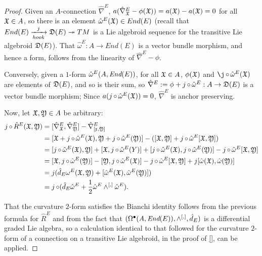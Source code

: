 \begin{proof}
Given an $A$-connection $\hat \nabla^E$, $a(\hat \nabla^E_{\oid X} - \phi(\oid X)) = a(\oid X) - a(\oid X) = 0$ for all $\mathfrak{X} \in A$, so there is an element $\hat \omega^E(\mathfrak{X}) \in End(E)$ (recall that $End(E) \xrightarrow[hook]{j} \mathfrak{D}(E) \twoheadrightarrow TM$ is a Lie algebroid sequence for the transitive Lie algebroid $\mathfrak{D}(E)$). That $\hat \omega^E: A \to End(E)$ is a vector bundle morphism, and hence a form, follows from the linearity of $\hat \nabla^E - \phi$. 

Conversely, given a $1$-form $\hat \omega^E(A, \operatorname{\textit{End}}(E))$, for all $\mathfrak{X} \in A$, $\phi(\oid X)$ and $\j \comp \hat \omega^E(\oid X)$ are elements of $\mathfrak{D}(E)$, and so is their sum, so $\hat \nabla^E := \phi + j \comp \hat \omega^E: A \to \alg D(E)$ is a vector bundle morphism; Since $a(j \operatorname{\circ} \hat \omega^E(\mathfrak{X})) = 0$, $\hat \nabla^E$ is anchor preserving.

Now, let $\mathfrak{X}, \mathfrak{Y} \in A$ be arbitrary:
\begin{align*}
    j \operatorname{\circ} \hat R^E(\mathfrak{X}, \mathfrak{Y}) 
        &= [\hat \nabla^E_{\mathfrak{X}}, \hat \nabla^E_{\mathfrak{Y}}] - \hat \nabla^E_{[\mathfrak{x}, \mathfrak{Y}]}\\
        &= [\mathfrak{X} + j \operatorname{\circ} \hat \omega^E(\mathfrak{X}), \mathfrak{Y} + j \operatorname{\circ} \hat \omega^E(\mathfrak{Y})] - ([\mathfrak{X}, \mathfrak{Y}] + j \operatorname{\circ} \hat \omega^E[\mathfrak{X}, \mathfrak{Y}])\\
        &= [j \operatorname{\circ} \hat \omega^E(\mathfrak{X}), \mathfrak{Y}] + [\mathfrak{X}, j \operatorname{\circ} \hat \omega^E(Y)] + [j \operatorname{\circ} \hat \omega^E(\mathfrak{X}), j \operatorname{\circ} \hat \omega^E(\mathfrak{Y})] - j \operatorname{\circ} \hat \omega^E[\mathfrak{X}, \mathfrak{Y}]\\
        &= [\mathfrak{X}, j \operatorname{\circ} \hat \omega^E(\mathfrak{Y})] - [\mathfrak{Y}, j \operatorname{\circ} \hat \omega^E(\mathfrak{X})] - j \operatorname{\circ} \hat \omega^E[\mathfrak{X}, \mathfrak{Y}] + j[\hat \omega(\mathfrak{X}), \hat \omega (\mathfrak{Y})]\\
        &= j(\hat d_E \omega^E(\mathfrak{X}, \mathfrak{Y}) + [\hat \omega^E(\mathfrak{X}), \hat \omega^E(\mathfrak{Y})])\\
        &= j \operatorname{\circ} (\hat d_E \hat \omega^E + \frac{1}{2} \hat \omega^E \wedge^{[,]} \hat \omega^E).
\end{align*}

That the curvature $2$-form satisfies the Bianchi identity follows from the previous formula for $\hat R^E$ and from the fact that $(\Omega^\bullet(A, \operatorname{\textit{End}}(E)), \wedge^{[,]}, \hat d_E)$ is a differential graded Lie algebra, so a calculation identical to that followed for the curvature $2$-form of a connection on a transitive Lie algebroid, in the proof of \ref{}, can be applied.
\end{proof}

